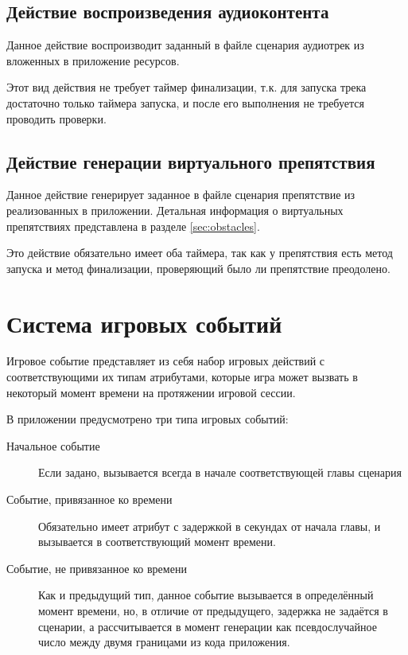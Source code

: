 \subsection*{Действие воспроизведения аудиоконтента}
Данное действие воспроизводит заданный в файле сценария аудиотрек из вложенных в приложение ресурсов.

Этот вид действия не требует таймер финализации, т.к. для запуска трека достаточно только таймера запуска, и после его выполнения не требуется проводить проверки.

\subsection*{Действие генерации виртуального препятствия}
Данное действие генерирует заданное в файле сценария препятствие из реализованных в приложении. Детальная информация о виртуальных препятствиях представлена в разделе \ref{sec:obstacles}.

Это действие обязательно имеет оба таймера, так как у препятствия есть метод запуска и метод финализации, проверяющий было ли препятствие преодолено.
 
\section{Система игровых событий}
\label{sec:events}
Игровое событие представляет из себя набор игровых действий с соответствующими их типам атрибутами, которые игра может вызвать в некоторый момент времени на протяжении игровой сессии.

В приложении предусмотрено три типа игровых событий:
\begin{description}
	\item [Начальное событие] Если задано, вызывается всегда в начале соответствующей главы сценария
	\item [Событие, привязанное ко времени] Обязательно имеет атрибут с задержкой в секундах от начала главы, и вызывается в соответствующий момент времени.
	\item [Событие, не привязанное ко времени] Как и предыдущий тип, данное событие вызывается в определённый момент времени, но, в отличие от предыдущего, задержка не задаётся в сценарии, а рассчитывается в момент генерации как псевдослучайное число между двумя границами из кода приложения.
\end{description}


